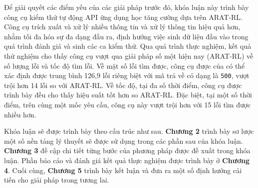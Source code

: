 

Để giải quyết các điểm yếu của các giải pháp trước đó, khóa luận này trình bày công cụ kiểm thử tự động API ứng dụng học tăng cường dựa trên ARAT-RL.
 Công cụ trích xuất và xử lý nhiều thông tin và xử lý thông tin hiệu quả hơn, nhằm tối đa hóa sự đa dạng đầu ra, định hướng việc sinh dữ liệu đầu vào trong quá trình đánh giá và sinh các ca kiểm thử. Qua quá trình thực nghiệm, kết quả thử nghiệm cho thấy công cụ  vượt qua giải pháp số một hiện nay (ARAT-RL) về số lượng lỗi và tốc độ tìm lỗi. Về mặt số lỗi tìm được,  công cụ được của  có thể xác định được trung bình 126,9 lỗi riêng biệt với mã trả về có dạng là \texttt{500}, vượt trội hơn 14 lỗi so với ARAT-RL. Về tốc độ, tại đa số thời điểm, công cụ được trình bày đều cho thấy hiệu suất tốt hơn so ARAT-RL. Đặc biệt, tại một số thời điểm, trên cùng một mốc yêu cầu, công cụ này vượt trội hơn với 15 lỗi tìm được nhiều hơn.

 Khóa luận sẽ được trình bày theo cấu trúc như sau. \textbf{Chương 2} trình bày sơ
lược một số nền tảng lý thuyết sẽ được sử dụng trong các phần sau của khóa luận.
\textbf{Chương 3} đề cập chi tiết từng bước của phương pháp được đề xuất trong khóa luận. Phần báo cáo và đánh giá kết quả thực nghiệm được trình bày ở \textbf{Chương 4}. Cuối cùng, \textbf{Chương 5} trình bày kết luận và đưa ra một số định hướng cải tiến cho giải pháp
trong tương lai.